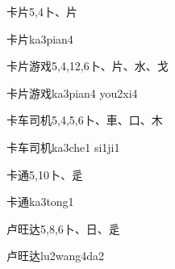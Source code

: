 \begin{entry}{卡片}{5,4}{⼘、⽚}
  \begin{phonetics}{卡片}{ka3pian4}
  \end{phonetics}
\end{entry}

\begin{entry}{卡片游戏}{5,4,12,6}{⼘、⽚、⽔、⼽}
  \begin{phonetics}{卡片游戏}{ka3pian4 you2xi4}
  \end{phonetics}
\end{entry}

\begin{entry}{卡车司机}{5,4,5,6}{⼘、⾞、⼝、⽊}
  \begin{phonetics}{卡车司机}{ka3che1 si1ji1}
  \end{phonetics}
\end{entry}

\begin{entry}{卡通}{5,10}{⼘、⾡}
  \begin{phonetics}{卡通}{ka3tong1}
  \end{phonetics}
\end{entry}

\begin{entry}{卢旺达}{5,8,6}{⼘、⽇、⾡}
  \begin{phonetics}{卢旺达}{lu2wang4da2}
  \end{phonetics}
\end{entry}


